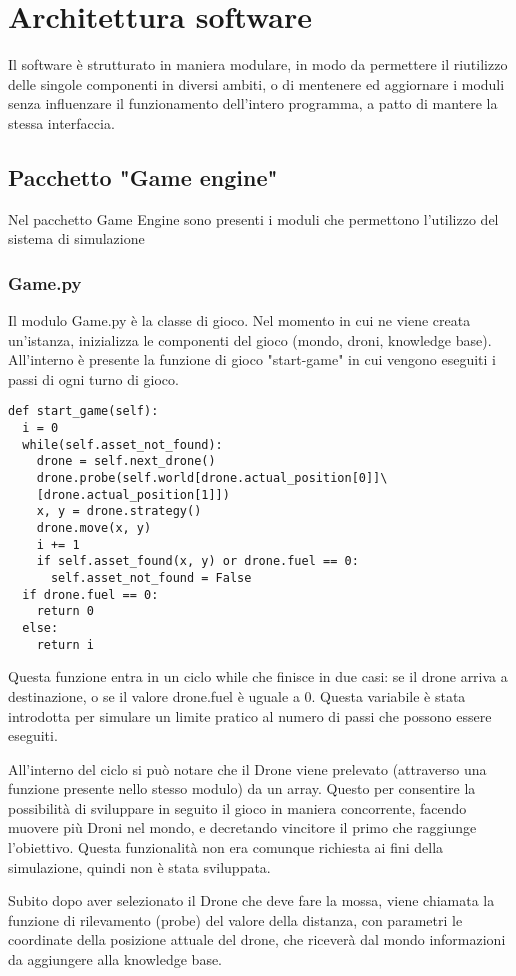	
\section{Architettura software}
Il software è strutturato in maniera modulare, in modo da permettere il riutilizzo delle singole componenti in diversi ambiti, o di mentenere ed aggiornare i moduli senza influenzare il funzionamento dell'intero programma, a patto di mantere la stessa interfaccia.

\subsection{Pacchetto "Game engine"}
Nel pacchetto Game Engine sono presenti i moduli che permettono l'utilizzo del sistema di simulazione

\subsubsection{Game.py}
Il modulo Game.py è la classe di gioco. Nel momento in cui ne viene creata un'istanza, inizializza le componenti del gioco (mondo, droni, knowledge base). All'interno è presente la funzione di gioco "start-game" in cui vengono eseguiti i passi di ogni turno di gioco. 
\begin{verbatim}
def start_game(self):
  i = 0
  while(self.asset_not_found):
    drone = self.next_drone()
    drone.probe(self.world[drone.actual_position[0]]\
    [drone.actual_position[1]])
    x, y = drone.strategy()
    drone.move(x, y)
    i += 1
    if self.asset_found(x, y) or drone.fuel == 0:
      self.asset_not_found = False
  if drone.fuel == 0:
    return 0
  else:
    return i
\end{verbatim}
Questa funzione entra in un ciclo while che finisce in due casi: se il drone arriva a destinazione, o se il valore drone.fuel è uguale a 0. Questa variabile è stata introdotta per simulare un limite pratico al numero di passi che possono essere eseguiti. 

All'interno del ciclo si può notare che il Drone viene prelevato (attraverso una funzione presente nello stesso modulo) da un array. Questo per consentire la possibilità di sviluppare in seguito il gioco in maniera concorrente, facendo muovere più Droni nel mondo, e decretando vincitore il primo che raggiunge l'obiettivo. Questa funzionalità non era comunque richiesta ai fini della simulazione, quindi non è stata sviluppata.

Subito dopo aver selezionato il Drone che deve fare la mossa, viene chiamata la funzione di rilevamento (probe) del valore della distanza, con parametri le coordinate della posizione attuale del drone, che riceverà dal mondo informazioni da aggiungere alla knowledge base. 


